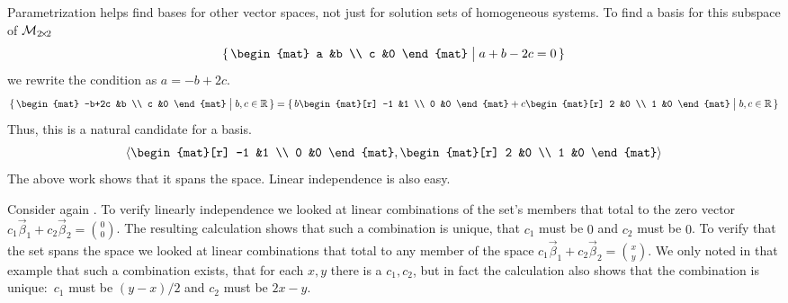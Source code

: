 \begin{example}
Parametrization helps find bases for other vector spaces, not just
for solution sets of homogeneous systems.
To find a basis for this subspace of $\mathcal{M}_{2 \! \times \! 2}$
\begin{equation*}
  \set{\begin{mat}
         a  &b  \\
         c  &0
       \end{mat} \suchthat a+b-2c=0}
\end{equation*}
we rewrite the condition as $a=-b+2c$.
\begin{equation*}
  \set{\begin{mat}
         -b+2c  &b  \\
          c     &0
       \end{mat} \suchthat b,c \in \Re}
  =\set{b\begin{mat}[r]
         -1  &1  \\
          0  &0
       \end{mat}+
       c\begin{mat}[r]
          2  &0  \\
          1  &0
       \end{mat} \suchthat b,c \in \Re}
\end{equation*}
Thus, this is a natural candidate for a basis.
\begin{equation*}
  \sequence{\begin{mat}[r]
         -1  &1  \\
          0  &0
       \end{mat},
       \begin{mat}[r]
          2  &0  \\
          1  &0
       \end{mat} }
\end{equation*}
The above work shows that it spans the space.
Linear independence is also easy.
\end{example}

Consider again .
To verify linearly independence we looked at 
linear combinations of the set's members that total to
the zero vector 
$c_1\vec{\beta}_1+c_2\vec{\beta}_2=\binom{0}{0}$.
The resulting 
calculation shows that such a combination is unique,
that $c_1$ must be $0$ and $c_2$ must be $0$.
To verify that the set spans the space we
looked at linear combinations that total to any
member of the space
$c_1\vec{\beta}_1+c_2\vec{\beta}_2=\binom{x}{y}$.
We only noted in that example that such a combination 
exists, that for each $x,y$ there is a $c_1,c_2$, but
in fact the calculation also shows that the combination is 
unique:~$c_1$ must be $(y-x)/2$ and $c_2$ must be $2x-y$.
 
